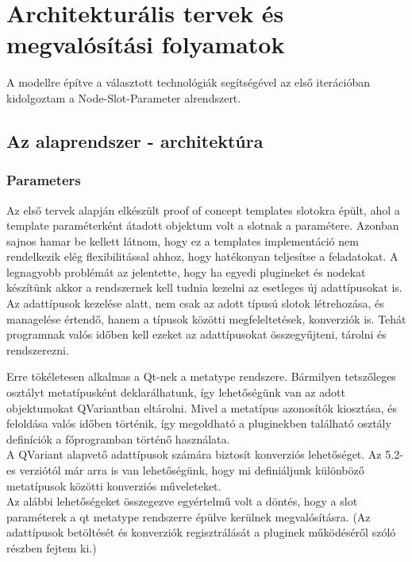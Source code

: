 \documentclass[a4paper,12pt,oneside]{report}
\begin{document}
\section{Architekturális tervek és megvalósítási folyamatok}
A modellre építve a választott technológiák segítségével az első iterációban kidolgoztam a Node-Slot-Parameter alrendszert.
\subsection{Az alaprendszer - architektúra}
\subsubsection{Parameters}
Az első tervek alapján elkészült proof of concept templates slotokra épült, ahol a template paraméterként átadott objektum volt a slotnak a paramétere. Azonban sajnos hamar be kellett látnom, hogy ez a templates implementáció nem rendelkezik elég flexibilitással ahhoz, hogy hatékonyan teljesítse a feladatokat. A legnagyobb problémát az jelentette, hogy ha egyedi plugineket és nodekat készítünk akkor a rendszernek kell tudnia kezelni az esetleges új adattípusokat is. Az adattípusok kezelése alatt, nem csak az adott típusú slotok létrehozása, és managelése értendő, hanem a típusok közötti megfeleltetések, konverziók is. Tehát programnak valós időben kell ezeket az adattípusokat összegyűjteni, tárolni és rendszerezni.

Erre tökéletesen alkalmas a Qt-nek a metatype rendszere. Bármilyen tetszőleges osztályt metatípusként deklarálhatunk, így lehetőségünk van az adott objektumokat QVariantban eltárolni. \cite{website:qt_metatype_1} Mivel a metatípus azonosítók kiosztása, és feloldása valós időben történik, így megoldható a pluginekben található osztály definíciók a főprogramban történő használata.\\
A QVariant alapvető adattípusok számára biztosít konverziós lehetőséget. Az 5.2-es verziótól már arra is van lehetőségünk, hogy mi definiáljunk különböző metatípusok közötti konverziós műveleteket. \\ Az alábbi lehetőségeket összegezve egyértelmű volt a döntés, hogy a slot paraméterek a qt metatype rendszerre épülve kerülnek megvalósításra. (Az adattípusok betöltését és konverziók regisztrálását a pluginek működéséről szóló részben fejtem ki.)
\end{document}

